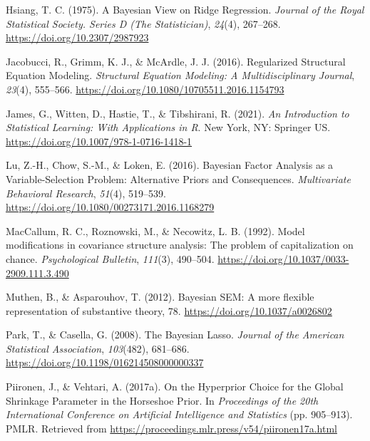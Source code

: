 \documentclass[
  man,floatsintext]{apa6}
\newlength{\cslhangindent}
\newlength{\cslentryspacingunit} %
\newenvironment{CSLReferences}[2] %
 {%
  \setlength{\parindent}{0pt}
  \ifodd #1
  \let\oldpar\par
  \def\par{\hangindent=\cslhangindent\oldpar}
  \fi
  \setlength{\parskip}{#2\cslentryspacingunit}
 }%
 {}
\begin{document}
\begin{CSLReferences}{1}{0}
\leavevmode{}%
Hsiang, T. C. (1975). A {Bayesian} {View} on {Ridge} {Regression}. \emph{Journal of the Royal Statistical Society. Series D (The Statistician)}, \emph{24}(4), 267--268. \url{https://doi.org/10.2307/2987923}

\leavevmode{}%
Jacobucci, R., Grimm, K. J., \& McArdle, J. J. (2016). Regularized {Structural} {Equation} {Modeling}. \emph{Structural Equation Modeling: A Multidisciplinary Journal}, \emph{23}(4), 555--566. \url{https://doi.org/10.1080/10705511.2016.1154793}

\leavevmode{}%
James, G., Witten, D., Hastie, T., \& Tibshirani, R. (2021). \emph{An {Introduction} to {Statistical} {Learning}: With {Applications} in {R}}. New York, NY: Springer US. \url{https://doi.org/10.1007/978-1-0716-1418-1}

\leavevmode{}%
Lu, Z.-H., Chow, S.-M., \& Loken, E. (2016). Bayesian {Factor} {Analysis} as a {Variable}-{Selection} {Problem}: {Alternative} {Priors} and {Consequences}. \emph{Multivariate Behavioral Research}, \emph{51}(4), 519--539. \url{https://doi.org/10.1080/00273171.2016.1168279}

\leavevmode{}%
MacCallum, R. C., Roznowski, M., \& Necowitz, L. B. (1992). Model modifications in covariance structure analysis: The problem of capitalization on chance. \emph{Psychological Bulletin}, \emph{111}(3), 490--504. \url{https://doi.org/10.1037/0033-2909.111.3.490}

\leavevmode{}%
Muthen, B., \& Asparouhov, T. (2012). Bayesian {SEM}: {A} more ﬂexible representation of substantive theory, 78. \url{https://doi.org/10.1037/a0026802}

\leavevmode{}%
Park, T., \& Casella, G. (2008). The {Bayesian} {Lasso}. \emph{Journal of the American Statistical Association}, \emph{103}(482), 681--686. \url{https://doi.org/10.1198/016214508000000337}

\leavevmode{}%
Piironen, J., \& Vehtari, A. (2017a). On the {Hyperprior} {Choice} for the {Global} {Shrinkage} {Parameter} in the {Horseshoe} {Prior}. In \emph{Proceedings of the 20th {International} {Conference} on {Artificial} {Intelligence} and {Statistics}} (pp. 905--913). PMLR. Retrieved from \url{https://proceedings.mlr.press/v54/piironen17a.html}


\end{CSLReferences}
\end{document}
